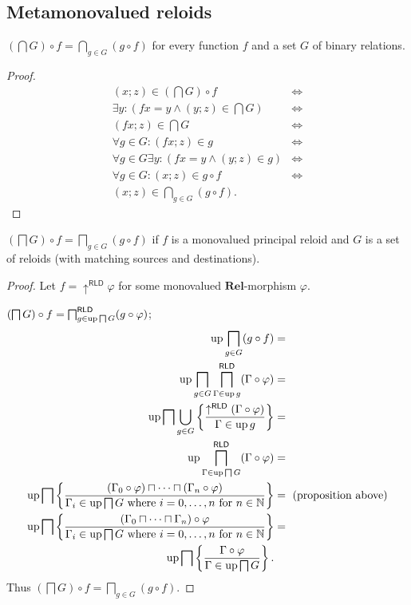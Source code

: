 \subsection{Metamonovalued reloids}
\begin{prop}
$\left(\bigcap G\right)\circ f=\bigcap_{g\in G}(g\circ f)$ for every
function $f$ and a set $G$ of binary relations.\end{prop}
\begin{proof}
~
\begin{align*}
(x;z)\in\left(\bigcap G\right)\circ f & \Leftrightarrow\\
\exists y:(fx=y\land(y;z)\in\bigcap G) & \Leftrightarrow\\
(fx;z)\in\bigcap G & \Leftrightarrow\\
\forall g\in G:(fx;z)\in g & \Leftrightarrow\\
\forall g\in G\exists y:(fx=y\land(y;z)\in g) & \Leftrightarrow\\
\forall g\in G:(x;z)\in g\circ f & \Leftrightarrow\\
(x;z)\in\bigcap_{g\in G}(g\circ f).
\end{align*}
\end{proof}
\begin{lem}
$\left(\bigsqcap G\right)\circ f=\bigsqcap_{g\in G}(g\circ f)$ if
$f$ is a monovalued principal reloid and $G$ is a set of reloids
(with matching sources and destinations).\end{lem}
\begin{proof}
Let $f=\uparrow^{\mathsf{RLD}}\varphi$ for some monovalued $\mathbf{Rel}$-morphism
$\varphi$.

$\left(\bigsqcap G\right)\circ f=\bigsqcap_{g\in\operatorname{up}\bigsqcap G}^{\mathsf{RLD}}(g\circ\varphi)$;
\begin{align*}
\operatorname{up}\bigsqcap_{g\in G}(g\circ f) & =\\
\operatorname{up}\bigsqcap_{g\in G}\bigsqcap_{\Gamma\in\operatorname{up} g}^{\mathsf{RLD}}(\Gamma\circ\varphi) & =\\
\operatorname{up}\bigsqcap\bigcup_{g\in G}\left\{ \frac{\uparrow^{\mathsf{RLD}}(\Gamma\circ\varphi)}{\Gamma\in\operatorname{up} g}\right\} & =\\
\operatorname{up}\bigsqcap_{\Gamma\in\operatorname{up}\bigsqcap G}^{\mathsf{RLD}}(\Gamma\circ\varphi) & =\\
\operatorname{up}\bigsqcap\left\{ \frac{(\Gamma_{0}\circ\varphi)\sqcap\dots\sqcap(\Gamma_{n}\circ\varphi)}{\Gamma_{i}\in\operatorname{up}\bigsqcap G\text{ where \ensuremath{i=0,\dots,n} for \ensuremath{n\in\mathbb{N}}}}\right\} & =\text{ (proposition above)}\\
\operatorname{up}\bigsqcap\left\{ \frac{(\Gamma_{0}\sqcap\dots\sqcap\Gamma_{n})\circ\varphi}{\Gamma_{i}\in\operatorname{up}\bigsqcap G\text{ where \ensuremath{i=0,\dots,n} for \ensuremath{n\in\mathbb{N}}}}\right\} & =\\
\operatorname{up}\bigsqcap\left\{ \frac{\Gamma\circ\varphi}{\Gamma\in\operatorname{up}\bigsqcap G}\right\}.
\end{align*}
Thus $\left(\bigsqcap G\right)\circ f=\bigsqcap_{g\in G}(g\circ f)$.\end{proof}
